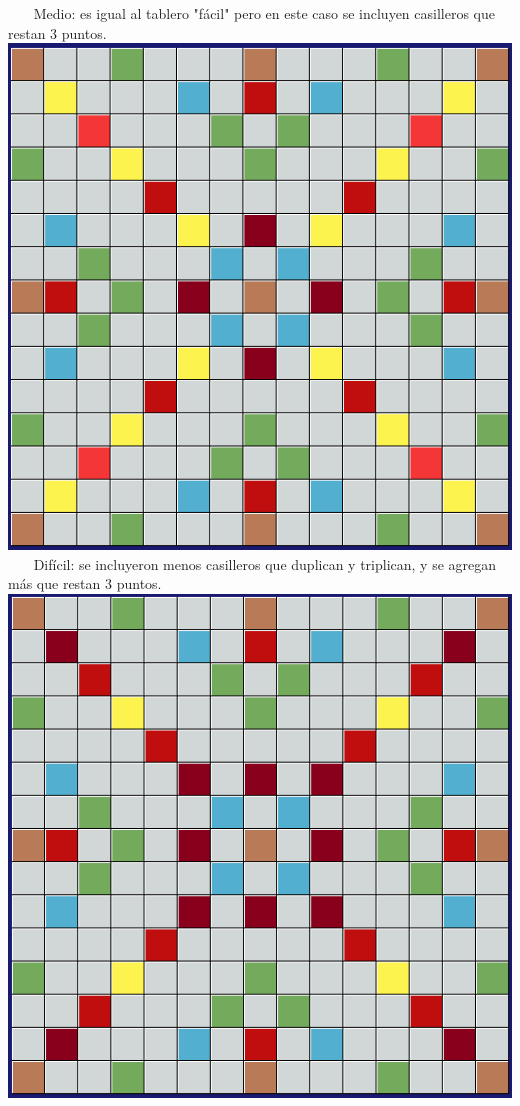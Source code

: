 \documentclass[12pt]{article}
\begin{document}
\
\
\
\newpage
Medio: es igual al tablero "fácil" pero en este caso se incluyen casilleros que restan 3 puntos.
\newline
\newline
\includegraphics[width=\textwidth]{images/medio.png}
\
\
\
\newpage
Difícil: se incluyeron menos casilleros que duplican y triplican, y se agregan más que restan 3 puntos.
\newline
\newline
\includegraphics[width=\textwidth]{images/dificil.png}
\end{document}
